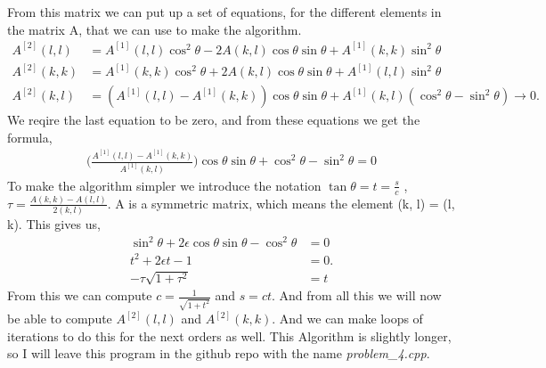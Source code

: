 \documentclass[english,notitlepage]{revtex4-1}  %
\begin{document}
From this matrix we can put up a set of equations, for the different elements in the matrix A, that we can use to make the algorithm.
\begin{align}
A^{[2]}(l, l) &= A^{[1]}(l, l) \cos^2 \theta - 2 A(k, l) \cos \theta \sin \theta + A^{[1]}(k, k) \sin^2 \theta \\
A^{[2]}(k, k) &= A^{[1]}(k, k) \cos^2 \theta + 2 A(k, l) \cos \theta \sin \theta + A^{[1]}(l, l) \sin^2 \theta \\
A^{[2]}(k, l) &= (A^{[1]}(l, l) - A^{[1]}(k, k))\cos \theta \sin \theta + A^{[1]}(k, l)(\cos^2 \theta - \sin^2 \theta) \rightarrow 0.
\end{align}
We reqire the last equation to be zero, and from these equations we get the formula, 
\begin{align}
\bigg( \frac{A^{[1]}(l, l) - A^{[1]}(k, k)}{A^{[1]}(k, l)} \bigg)\cos \theta \sin \theta + \cos^2 \theta - \sin^2 \theta = 0
\end{align}
To make the algorithm simpler we introduce the notation $\tan \theta = t = \frac{s}{c}$ , $\tau = \frac{A(k, k) - A(l, l)}{2(k, l)}$. A is a symmetric matrix, which means the element (k, l) = (l, k). This gives us, 
\begin{align}
\sin^2 \theta + 2\epsilon \cos \theta \sin \theta - \cos^2 \theta &= 0 \\
t^2 + 2\epsilon t - 1 &= 0.\\
 -\tau \sqrt{1 + \tau^2} &= t
\end{align}
From this we can compute $c = \frac{1}{\sqrt{1 + t^2}}$ and $s = ct$. And from all this we will now be able to compute $A^{[2]}(l, l)$ and $A^{[2]}(k, k)$. And we can make loops of iterations to do this for the next orders as well. This Algorithm is slightly longer, so I will leave this program in the github repo with the name \textit{problem\_4.cpp}. 






















   
\end{document}
